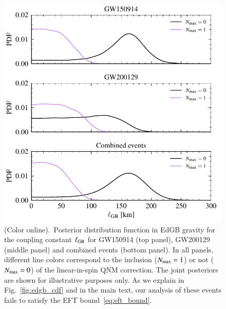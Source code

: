 \documentclass[twocolumn,
               prd,
               aps,
               superscriptaddress,
               tightenlines,
               nofootinbib,
               eqsecnum,
               amsfonts,
               amsmath,
               longbibliography]{revtex4-1}
\begin{document}
\begin{figure}[t]
\includegraphics[width=\columnwidth]{figs/edgb_posteriors_combined.pdf}
\caption{(Color online).~Posterior distribution function in EdGB gravity
for the coupling constant $\ell_{\rm GB}$ for GW150914 (top panel), GW200129 (middle panel)
and combined events (bottom panel).
%
In all panels, different line colors correspond to the inclusion ($N_{\rm max} = 1$) or not ($N_{\rm max} = 0$)
of the linear-in-spin QNM correction.
%
The joint posteriors are shown for illustrative purposes only. As we explain in Fig.~\ref{fig:edgb_cdf} and
in the main text, our analysis of these events fails to satisfy the EFT bound~\eqref{eq:eft_bound}.
}
\label{fig:edgb_exec_sum}
\end{figure}
\end{document}
